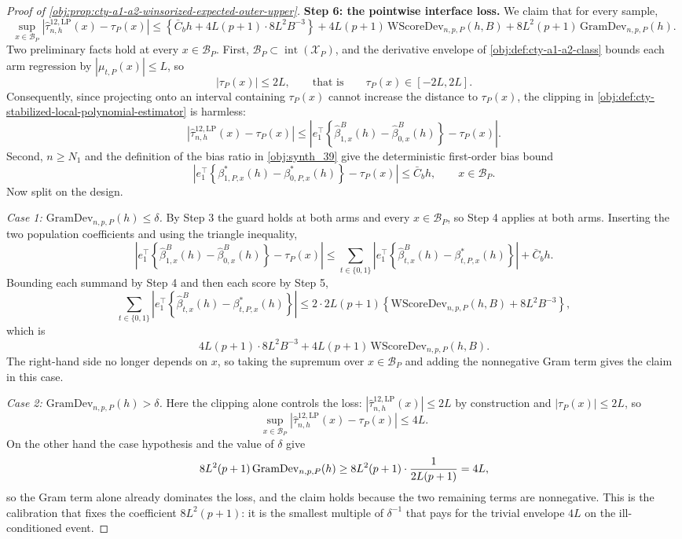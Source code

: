 \begin{proof}[Proof of \cref{obj:prop:cty-a1-a2-winsorized-expected-outer-upper}]
\textbf{Step 6: the pointwise interface loss.}  We claim that for every sample,
\[
\sup_{x\in\mathcal B_P}
\left|\widehat\tau^{12,\mathrm{LP}}_{n,h}(x)-\tau_P(x)\right|
\leq
\left\{\bar C_bh+4L(p+1)\cdot8L^2B^{-3}\right\}
+
4L(p+1)\,\mathrm{WScoreDev}_{n,p,P}(h,B)
+
8L^2(p+1)\,\mathrm{GramDev}_{n,p,P}(h) .
\]
Two preliminary facts hold at every \(x\in\mathcal B_P\).  First, \(\mathcal B_P\subset\operatorname{int}(\mathcal X_P)\), and the derivative envelope of \cref{obj:def:cty-a1-a2-class} bounds each arm regression by \(|\mu_{t,P}(x)|\leq L\), so
\[
|\tau_P(x)|\leq2L,
\qquad\text{that is}\qquad
\tau_P(x)\in[-2L,2L] .
\]
Consequently, since projecting onto an interval containing \(\tau_P(x)\) cannot increase the distance to \(\tau_P(x)\), the clipping in \cref{obj:def:cty-stabilized-local-polynomial-estimator} is harmless:
\[
\left|\widehat\tau^{12,\mathrm{LP}}_{n,h}(x)-\tau_P(x)\right|
\leq
\left|e_1^\top\left\{\widehat\beta^B_{1,x}(h)-\widehat\beta^B_{0,x}(h)\right\}-\tau_P(x)\right| .
\]
Second, \(n\geq N_1\) and the definition of the bias ratio in \cref{obj:synth_39} give the deterministic first-order bias bound
\[
\left|e_1^\top\left\{\beta^*_{1,P,x}(h)-\beta^*_{0,P,x}(h)\right\}-\tau_P(x)\right|
\leq
\bar C_bh,
\qquad x\in\mathcal B_P .
\]
Now split on the design.

\emph{Case 1: \(\mathrm{GramDev}_{n,p,P}(h)\leq\delta\).}  By Step 3 the guard holds at both arms and every \(x\in\mathcal B_P\), so Step 4 applies at both arms.  Inserting the two population coefficients and using the triangle inequality,
\[
\left|e_1^\top\left\{\widehat\beta^B_{1,x}(h)-\widehat\beta^B_{0,x}(h)\right\}-\tau_P(x)\right|
\leq
\sum_{t\in\{0,1\}}
\left|e_1^\top\left\{\widehat\beta^B_{t,x}(h)-\beta^*_{t,P,x}(h)\right\}\right|
+
\bar C_bh .
\]
Bounding each summand by Step 4 and then each score by Step 5,
\[
\sum_{t\in\{0,1\}}
\left|e_1^\top\left\{\widehat\beta^B_{t,x}(h)-\beta^*_{t,P,x}(h)\right\}\right|
\leq
2\cdot2L(p+1)\left\{\mathrm{WScoreDev}_{n,p,P}(h,B)+8L^2B^{-3}\right\} ,
\]
which is
\[
4L(p+1)\cdot8L^2B^{-3}
+
4L(p+1)\,\mathrm{WScoreDev}_{n,p,P}(h,B) .
\]
The right-hand side no longer depends on \(x\), so taking the supremum over \(x\in\mathcal B_P\) and adding the nonnegative Gram term gives the claim in this case.

\emph{Case 2: \(\mathrm{GramDev}_{n,p,P}(h)>\delta\).}  Here the clipping alone controls the loss: \(|\widehat\tau^{12,\mathrm{LP}}_{n,h}(x)|\leq2L\) by construction and \(|\tau_P(x)|\leq2L\), so
\[
\sup_{x\in\mathcal B_P}\left|\widehat\tau^{12,\mathrm{LP}}_{n,h}(x)-\tau_P(x)\right|\leq4L .
\]
On the other hand the case hypothesis and the value of \(\delta\) give
\[
8L^2(p+1)\,\mathrm{GramDev}_{n,p,P}(h)
\geq
8L^2(p+1)\cdot{1\over2L(p+1)}
=
4L ,
\]
so the Gram term alone already dominates the loss, and the claim holds because the two remaining terms are nonnegative.  This is the calibration that fixes the coefficient \(8L^2(p+1)\): it is the smallest multiple of \(\delta^{-1}\) that pays for the trivial envelope \(4L\) on the ill-conditioned event.


\end{proof}
